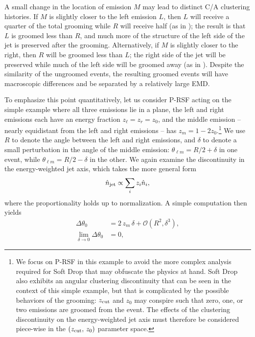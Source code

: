 A small change in the location of emission \(M\) may lead to distinct C/A clustering histories.
%
If \(M\) is slightly closer to the left emission \(L\), then \(L\) will receive a quarter of the total grooming while \(R\) will receive half (as in );
%
the result is that \(L\) is groomed less than \(R\), and much more of the structure of the left side of the jet is preserved after the grooming.
%
Alternatively, if \(M\) is slightly closer to the right, then \(R\) will be groomed less than \(L\);
%
the right side of the jet will be preserved while much of the left side will be groomed away (as in ).
%
Despite the similarity of the ungroomed events, the resulting groomed events will have macroscopic differences and be separated by a relatively large EMD.

To emphasize this point quantitatively, let us consider P-RSF acting on the simple example where all three emissions lie in a plane, the left and right emissions each have an energy fraction \(z_\ell = z_r = z_0\), and the middle emission -- nearly equidistant from the left and right emissions -- has \(z_m = 1-2z_0\).\footnote{We focus on P-RSF in this example to avoid the more complex analysis required for Soft Drop that may obfuscate the physics at hand.
%
Soft Drop also exhibits an angular clustering discontinuity that can be seen in the context of this simple example, but that is complicated by the possible behaviors of the grooming:
%
\(z_{\rm cut}\) and \(z_0\) may conspire such that zero, one, or two emissions are groomed from the event.
%
The effects of the clustering discontinuity on the energy-weighted jet axis must therefore be considered piece-wise in the \((z_{\rm cut},\,z_0)\) parameter space.
}
%
We use \(R\) to denote the angle between the left and right emissions, and \(\delta\) to denote a small perturbation in the angle of the middle emission:
%
\(\theta_{\ell m} = R/2 + \delta\) in one event, while \(\theta_{\ell m} = R/2 - \delta\) in the other.
%
We again examine the discontinuity in the energy-weighted jet axis, which takes the more general form
\begin{align}
    \hat{n}_{\rm jet} \propto \sum_i z_i \hat{n}_i
    ,
\end{align}
where the proportionality holds up to normalization.
%
A simple computation then yields
\begin{subequations}
\begin{align}
    \Delta\theta_0
    &=
    2\, z_m \, \delta
    +
    \mathcal{O}\left(R^2, \delta^3\right)
    ,
    \\
    \lim_{\delta\to 0}\Delta\theta_0 &= 0
    ,
\end{align}
\end{subequations}
